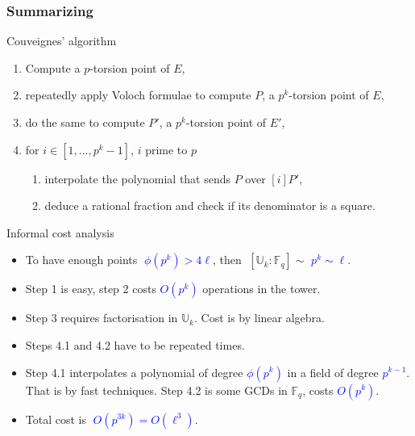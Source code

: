 \documentclass[10pt]{beamer}
\newcommand{\blue}[1]{\textcolor{blue}{#1}}  %
\newcommand{\U}{\mathbb{U}}  %
\newcommand{\F}{\mathbb{F}}  %
\newcommand{\euler}{\phi}  %
\newcommand{\0}{\mathcal{O}}  %
\begin{document}
\begin{frame}
  \frametitle{Summarizing}

  \vspace{-1mm}

  \begin{block}{Couveignes' algorithm}
    \begin{enumerate}
    \item Compute a $p$-torsion point of $E$,
    \item repeatedly apply Voloch formulae to compute $P$, a $p^k$-torsion
      point of $E$,
    \item do the same to compute $P'$, a $p^k$-torsion point of $E'$,
    \item for $i \in [1,\dots,p^k-1]$, $i$ prime to $p$
      \begin{enumerate}
      \item interpolate the polynomial that sends $P$ over $[i]P'$,
      \item deduce a rational fraction and check if its denominator is
        a square.
      \end{enumerate}
    \end{enumerate}
  \end{block}

  \vspace{-1mm}

  \begin{block}{Informal cost analysis}
    \begin{itemize}
    \item To have enough points \blue{$\;\euler(p^k) > 4\ell$}, then
      $\;[\U_k:\F_q] \sim$ \blue{$p^k \sim \ell$}.
    \item Step 1 is easy, step 2 costs \blue{$O(p^k)$}
      operations in the tower.
    \item Step 3 requires factorisation in $\U_k$. Cost is
      \alt<2>{\alert{$O(p^{3k})$}}{\blue{$O(p^{3k})$}} by linear
      algebra.
    \item Steps 4.1 and 4.2 have to be repeated
      \alt<2>{\alert{$\euler(p^k)$}}{\blue{$\euler(p^k)$}} times.
    \item Step 4.1 interpolates a polynomial of degree
      \blue{$\euler(p^k)$} in a field of degree \blue{$p^{k-1}$}. That
      is \alt<2>{\alert{$O(p^{2k})$}}{\blue{$O(p^{2k})$}} by fast
      techniques.  Step 4.2 is some GCDs in $\F_q$, costs
      \blue{$O(p^k)$}.
    \item<2> Total cost is \blue{$\;O(p^{3k}) = O(\ell^3)$}.
    \end{itemize}
  \end{block}
  
\end{frame}
\end{document}
